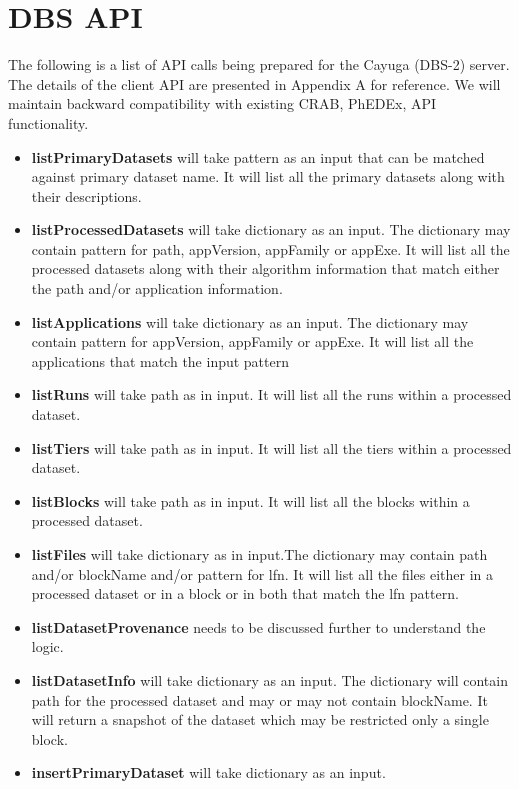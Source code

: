 \documentclass{cmspaper}
\begin{document}

\section{DBS API}

The following is a list of API calls being prepared for the Cayuga (DBS-2) server. The details of the client API are presented in Appendix A for reference. We will maintain backward compatibility with existing CRAB, PhEDEx, API functionality. 
\begin{itemize}
   \item {\bf listPrimaryDatasets} will take pattern as an input that can be matched against primary dataset name. It will list all the primary datasets along with their descriptions.
   \item {\bf listProcessedDatasets} will take dictionary as an input. The dictionary may contain pattern for path, appVersion, appFamily or appExe. It will list all the processed datasets along with their algorithm information that match either the path and/or application information.
   \item {\bf listApplications} will take dictionary as an input. The dictionary may contain pattern for appVersion, appFamily or appExe. It will list all the applications that match the input pattern
   \item {\bf listRuns} will take path as in input. It will list all the runs within a processed dataset.
   \item {\bf listTiers} will take path as in input. It will list all the tiers within a processed dataset.
   \item {\bf listBlocks} will take path as in input. It will list all the blocks within a processed dataset.
   \item {\bf listFiles} will take dictionary as in input.The dictionary may contain path and/or blockName and/or pattern for lfn.  It will list all the files either in a processed dataset or in a block or in both that match the lfn pattern.
   \item {\bf listDatasetProvenance} needs to be discussed further to understand the logic.
   \item {\bf listDatasetInfo} will take dictionary as an input. The dictionary will contain path for the processed dataset and may or may not contain blockName. It will return a snapshot of the dataset which may be restricted only a single block.
   \item {\bf insertPrimaryDataset} will take dictionary as an input.

\end{itemize}
\end{document}
